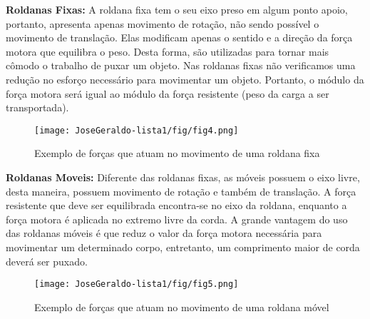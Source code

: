 \textbf{Roldanas Fixas:} A roldana fixa tem o seu eixo preso em algum ponto apoio, portanto, apresenta apenas movimento de rotação, não sendo possível o movimento de translação.
Elas modificam apenas o sentido e a direção da força motora que equilibra o peso. Desta forma, são utilizadas para tornar mais cômodo o trabalho de puxar um objeto.
Nas roldanas fixas não verificamos uma redução no esforço necessário para movimentar um objeto. Portanto, o módulo da força motora será igual ao módulo da força resistente (peso da carga a ser transportada)\cite{site1}.

\begin{figure}[ht]
    \centering
    \texttt{[image: JoseGeraldo-lista1/fig/fig4.png]}
    \caption{Exemplo de forças que atuam no movimento de uma roldana fixa}
\end{figure}


\textbf{Roldanas Moveis:} Diferente das roldanas fixas, as móveis possuem o eixo livre, desta maneira, possuem movimento de rotação e também de translação.
A força resistente que deve ser equilibrada encontra-se no eixo da roldana, enquanto a força motora é aplicada no extremo livre da corda.
A grande vantagem do uso das roldanas móveis é que reduz o valor da força motora necessária para movimentar um determinado corpo, entretanto, um comprimento maior de corda deverá ser puxado\cite{site1}.
\begin{figure}[ht]
    \centering
    \texttt{[image: JoseGeraldo-lista1/fig/fig5.png]}
    \caption{Exemplo de forças que atuam no movimento de uma roldana móvel}
\end{figure}